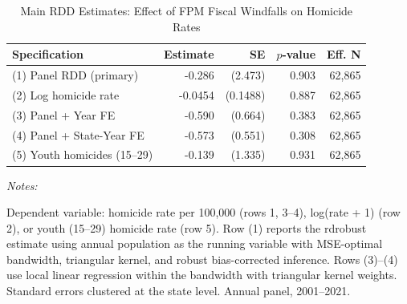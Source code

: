 \begin{table}[!h]
\centering
\small
\caption{\label{tab:main}Main RDD Estimates: Effect of FPM Fiscal Windfalls on Homicide Rates}
\centering
\small
\begin{threeparttable}
\begin{tabular}[t]{lrrrr}
\toprule
Specification & Estimate & SE & $p$-value & Eff. N\\
\midrule
(1) Panel RDD (primary) & -0.286 & (2.473) & 0.903 & 62,865\\
(2) Log homicide rate & -0.0454 & (0.1488) & 0.887 & 62,865\\
(3) Panel + Year FE & -0.590 & (0.664) & 0.383 & 62,865\\
(4) Panel + State-Year FE & -0.573 & (0.551) & 0.308 & 62,865\\
(5) Youth homicides (15--29) & -0.139 & (1.335) & 0.931 & 62,865\\
\bottomrule
\end{tabular}
\begin{tablenotes}
\item \textit{Notes:} 
\item Dependent variable: homicide rate per 100,000 (rows 1, 3--4), log(rate + 1) (row 2), or youth (15--29) homicide rate (row 5). Row (1) reports the rdrobust estimate using annual population as the running variable with MSE-optimal bandwidth, triangular kernel, and robust bias-corrected inference. Rows (3)--(4) use local linear regression within the bandwidth with triangular kernel weights. Standard errors clustered at the state level. Annual panel, 2001--2021.
\end{tablenotes}
\end{threeparttable}
\end{table}
